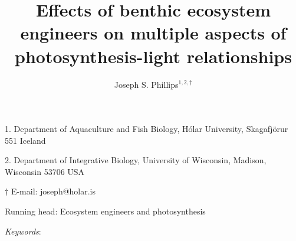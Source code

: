 \documentclass[12pt]{article}
\title{Effects of benthic ecosystem engineers on multiple aspects of photosynthesis-light relationships}
\author{
Joseph S. Phillips$^{1,2,\dagger}$}
\date{}
\begin{document}
\raggedright
\setlength\parindent{0.25in}

\maketitle

\noindent{} 1. Department of Aquaculture and Fish Biology, H\'{o}lar University, Skagafj\"{o}r{\dh}ur 551 Iceland

\noindent{} 2. Department of Integrative Biology, University of Wisconsin, Madison, Wisconsin 53706 USA

\noindent{} $\dagger$ E-mail: joseph@holar.is

\bigskip

Running head: {Ecosystem engineers and photosynthesis}

\linenumbers{}

\clearpage








\bigskip

\textit{Keywords}: {}











\end{document}
